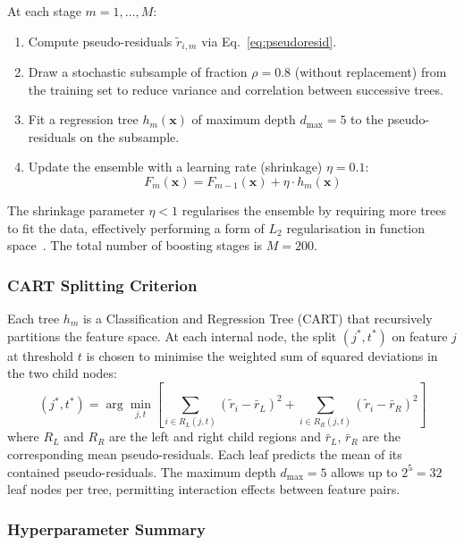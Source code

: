 \documentclass[11pt,a4paper]{article}
\begin{document}
At each stage $m = 1, \ldots, M$:
\begin{enumerate}
    \item Compute pseudo-residuals $\tilde{r}_{i,m}$ via Eq.~\eqref{eq:pseudoresid}.
    \item Draw a stochastic subsample of fraction $\rho = 0.8$ (without replacement) from the training set to reduce variance and correlation between successive trees.
    \item Fit a regression tree $h_m(\mathbf{x})$ of maximum depth $d_{\max} = 5$ to the pseudo-residuals on the subsample.
    \item Update the ensemble with a learning rate (shrinkage) $\eta = 0.1$:
    \begin{equation}
        F_m(\mathbf{x}) = F_{m-1}(\mathbf{x}) + \eta \cdot h_m(\mathbf{x})
    \end{equation}
\end{enumerate}

The shrinkage parameter $\eta < 1$ regularises the ensemble by requiring more trees to fit the data, effectively performing a form of $L_2$ regularisation in function space~\cite{friedman2001}. The total number of boosting stages is $M = 200$.

\subsubsection{CART Splitting Criterion}

Each tree $h_m$ is a Classification and Regression Tree (CART) that recursively partitions the feature space. At each internal node, the split $(j^*, t^*)$ on feature $j$ at threshold $t$ is chosen to minimise the weighted sum of squared deviations in the two child nodes:
\begin{equation}
    (j^*, t^*) = \arg\min_{j, t} \left[ \sum_{i \in R_L(j,t)} (\tilde{r}_i - \bar{r}_L)^2 + \sum_{i \in R_R(j,t)} (\tilde{r}_i - \bar{r}_R)^2 \right]
    \label{eq:split}
\end{equation}
where $R_L$ and $R_R$ are the left and right child regions and $\bar{r}_L$, $\bar{r}_R$ are the corresponding mean pseudo-residuals. Each leaf predicts the mean of its contained pseudo-residuals. The maximum depth $d_{\max} = 5$ allows up to $2^5 = 32$ leaf nodes per tree, permitting interaction effects between feature pairs.

\subsubsection{Hyperparameter Summary}
\end{document}
